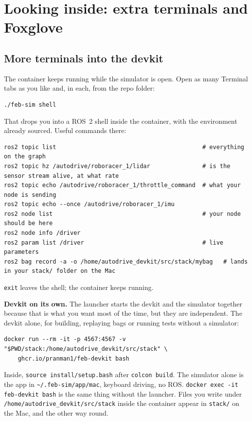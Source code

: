 \documentclass[11pt,a4paper]{article}
\begin{document}
\section{Looking inside: extra terminals and Foxglove}

\subsection*{More terminals into the devkit}

The container keeps running while the simulator is open. Open as many Terminal tabs as you
like and, in each, from the repo folder:

\begin{lstlisting}
./feb-sim shell
\end{lstlisting}

That drops you into a ROS~2 shell inside the container, with the environment already sourced.
Useful commands there:

\begin{lstlisting}
ros2 topic list                                          # everything on the graph
ros2 topic hz /autodrive/roboracer_1/lidar               # is the sensor stream alive, at what rate
ros2 topic echo /autodrive/roboracer_1/throttle_command  # what your node is sending
ros2 topic echo --once /autodrive/roboracer_1/imu
ros2 node list                                           # your node should be here
ros2 node info /driver
ros2 param list /driver                                  # live parameters
ros2 bag record -a -o /home/autodrive_devkit/src/stack/mybag   # lands in your stack/ folder on the Mac
\end{lstlisting}

\texttt{exit} leaves the shell; the container keeps running.

\textbf{Devkit on its own.} The launcher starts the devkit and the simulator together because
that is what you want most of the time, but they are independent. The devkit alone, for
building, replaying bags or running tests without a simulator:
\begin{lstlisting}
docker run --rm -it -p 4567:4567 -v "$PWD/stack:/home/autodrive_devkit/src/stack" \
    ghcr.io/pranman1/feb-devkit bash
\end{lstlisting}
Inside, \texttt{source install/setup.bash} after \texttt{colcon build}. The simulator alone is the
app in \texttt{\textasciitilde/.feb-sim/app/mac}, keyboard driving, no ROS. \texttt{docker exec -it feb-devkit
bash} is the same thing without the launcher. Files you write under
\texttt{/home/autodrive\_devkit/src/stack} inside the container appear in \texttt{stack/} on the
Mac, and the other way round.
\end{document}
